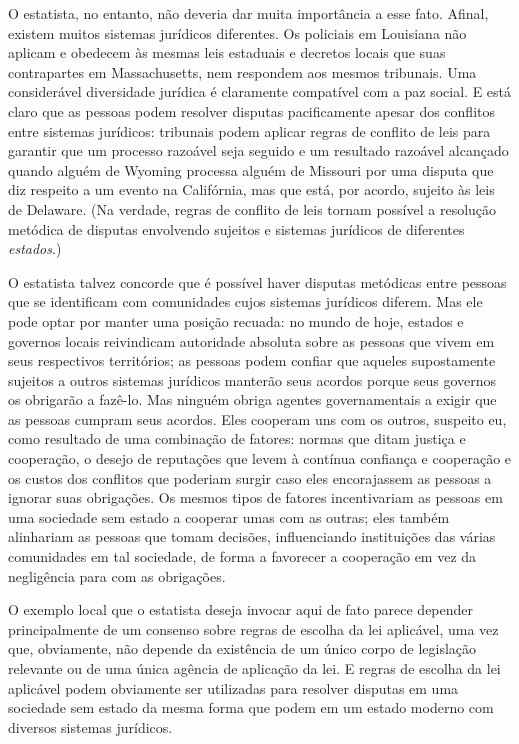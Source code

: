 O estatista, no entanto, não deveria dar muita importância a esse fato. Afinal, existem muitos sistemas jurídicos diferentes. Os policiais em Louisiana não aplicam e obedecem às mesmas leis estaduais e decretos locais que suas contrapartes em Massachusetts, nem respondem aos mesmos tribunais. Uma considerável diversidade jurídica é claramente compatível com a paz social. E está claro que as pessoas podem resolver disputas pacificamente apesar dos conflitos entre sistemas jurídicos: tribunais podem aplicar regras de conflito de leis para garantir que um processo razoável seja seguido e um resultado razoável alcançado quando alguém de Wyoming processa alguém de Missouri por uma disputa que diz respeito a um evento na Califórnia, mas que está, por acordo, sujeito às leis de Delaware. (Na verdade, regras de conflito de leis tornam possível a resolução metódica de disputas envolvendo sujeitos e sistemas jurídicos de diferentes \emph{estados}.)

O estatista talvez concorde que é possível haver disputas metódicas entre pessoas que se identificam com comunidades cujos sistemas jurídicos diferem. Mas ele pode optar por manter uma posição recuada: no mundo de hoje, estados e governos locais reivindicam autoridade absoluta sobre as pessoas que vivem em seus respectivos territórios; as pessoas podem confiar que aqueles supostamente sujeitos a outros sistemas jurídicos manterão seus acordos porque seus governos os obrigarão a fazê-lo. Mas ninguém obriga agentes governamentais a exigir que as pessoas cumpram seus acordos. Eles cooperam uns com os outros, suspeito eu, como resultado de uma combinação de fatores: normas que ditam justiça e cooperação, o desejo de reputações que levem à contínua confiança e cooperação e os custos dos conflitos que poderiam surgir caso eles encorajassem as pessoas a ignorar suas obrigações. Os mesmos tipos de fatores incentivariam as pessoas em uma sociedade sem estado a cooperar umas com as outras; eles também alinhariam as pessoas que tomam decisões, influenciando instituições das várias comunidades em tal sociedade, de forma a favorecer a cooperação em vez da negligência para com as obrigações.

O exemplo local que o estatista deseja invocar aqui de fato parece depender principalmente de um consenso sobre regras de escolha da lei aplicável, uma vez que, obviamente, não depende da existência de um único corpo de legislação relevante ou de uma única agência de aplicação da lei. E regras de escolha da lei aplicável podem obviamente ser utilizadas para resolver disputas em uma sociedade sem estado da mesma forma que podem em um estado moderno com diversos sistemas jurídicos. 

